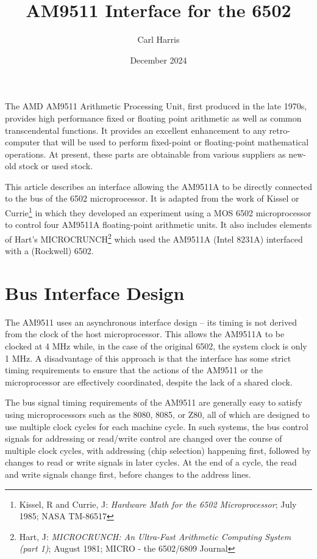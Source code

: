 \documentclass[11pt, letterpaper]{article}
\title{AM9511 Interface for the 6502}
\author{Carl Harris}
\date{December 2024}
\begin{document}
\maketitle
\noindent 
The AMD AM9511 Arithmetic Processing Unit, first produced in the late 1970s, 
provides high performance fixed or floating point arithmetic as well as
common transcendental functions. It provides an excellent enhancement to any 
retro-computer that will be used to perform fixed-point or floating-point 
mathematical operations. At present, these parts are obtainable from various 
suppliers as new-old stock or used stock.

This article describes an interface allowing the AM9511A to be directly 
connected to the bus of the 6502 microprocessor. It is adapted from the work 
of Kissel or Currie\footnote{Kissel, R and Currie, J: 
\emph{Hardware Math for the 6502 Microprocessor}; July 1985; 
NASA TM-86517} in which they developed an experiment using a MOS 6502 
microprocessor to control four AM9511A floating-point arithmetic units. It
also includes elements of Hart’s MICROCRUNCH\footnote{Hart, J: 
\emph{MICROCRUNCH: An Ultra-Fast Arithmetic Computing System (part 1)}; 
August 1981; MICRO - the 6502/6809 Journal} which used the AM9511A 
(Intel 8231A) interfaced with a (Rockwell) 6502.

\section{Bus Interface Design}
The AM9511 uses an asynchronous interface design -- its timing is not derived 
from the clock of the host microprocessor. This allows the AM9511A to be 
clocked at 4 MHz while, in the case of the original 6502, the system clock 
is only 1 MHz. A disadvantage of this approach is that the interface has 
some strict timing requirements to ensure that the actions of the AM9511 
or the microprocessor are effectively coordinated, despite the lack of a 
shared clock.

The bus signal timing requirements of the AM9511 are generally easy to 
satisfy using microprocessors such as the 8080, 8085, or Z80, all of which
are designed to use multiple clock cycles for each machine cycle. In such 
systems, the bus control signals for addressing or read/write control are 
changed over the course of multiple clock cycles, with addressing (chip 
selection) happening first, followed by changes to read or write signals 
in later cycles. At the end of a cycle, the read and write signals change
first, before changes to the address lines.
\end{document}
